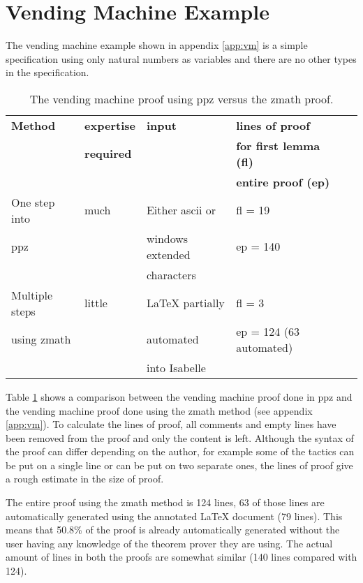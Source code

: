 \section{Vending Machine Example}

The vending machine example shown in appendix \ref{app:vm} is a simple
specification using only natural numbers as variables and there are no other
types in the specification. 

\begin{table}[H]
\begin{center}
\begin{tabular}{| l || l | l | l | l |}
\hline
\textbf{Method} & \textbf{expertise} &  \textbf{input} & \textbf{lines of proof}
\\
& \textbf{required} & & \textbf{for first lemma (fl)}  \\
& & & \textbf{entire proof (ep)} \\
\hline
One step into & much & Either ascii or & fl = 19  \\
\gls{ppz} & & windows extended & ep = 140 \\
& & characters & \\
\hline
Multiple steps & little & \LaTeX{} partially & fl = 3  \\
using \gls{zmath} & & automated & ep = 124 (63 automated) \\
& & into Isabelle & \\
\hline
\end{tabular}
\end{center}
\caption{The vending machine proof using \gls{ppz} versus the \gls{zmath} proof.}
\label{tab:comparevm}
\end{table}

Table \ref{tab:comparevm} shows a comparison between the vending
machine proof done in \gls{ppz} \cite{pp} and the vending machine proof done
using the \gls{zmath} method (see appendix \ref{app:vm}). To calculate the lines
of proof, all comments and empty lines have been removed from the proof and only
the content is left. Although the syntax of the proof can differ depending on
the author, for example some of the tactics can be put on a single line or can
be put on two separate ones, the lines of proof give a rough estimate in the
size of  proof.

The entire proof using the \gls{zmath} method is 124 lines, 63 of those lines
are automatically generated using the annotated \LaTeX{} document (79 lines).
This means that 50.8\% of the proof is already automatically generated without
the user having any knowledge of the theorem prover they are using. The actual
amount of lines in both the proofs are somewhat similar (140 lines compared with
124).

